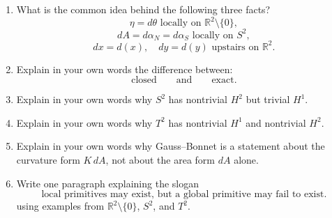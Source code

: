 \documentclass[11pt]{article}
\begin{document}
	\begin{enumerate}[leftmargin=2em,label=\textbf{H\arabic*.}]
		\item What is the common idea behind the following three facts?
		\[
		\eta=d\theta \text{ locally on }\mathbb{R}^2\setminus\{0\},
		\]
		\[
		dA=d\alpha_N=d\alpha_S \text{ locally on }S^2,
		\]
		\[
		dx=d(x),\quad dy=d(y) \text{ upstairs on }\mathbb{R}^2.
		\]
		
		\item Explain in your own words the difference between:
		\[
		\text{closed}
		\qquad\text{and}\qquad
		\text{exact}.
		\]
		
		\item Explain in your own words why \(S^2\) has nontrivial \(H^2\) but trivial \(H^1\).
		
		\item Explain in your own words why \(T^2\) has nontrivial \(H^1\) and nontrivial \(H^2\).
		
		\item Explain in your own words why Gauss--Bonnet is a statement about the curvature form \(K\,dA\), not about the area form \(dA\) alone.
		
		\item Write one paragraph explaining the slogan
		\[
		\boxed{\text{local primitives may exist, but a global primitive may fail to exist.}}
		\]
		using examples from \(\mathbb{R}^2\setminus\{0\}\), \(S^2\), and \(T^2\).
	\end{enumerate}
	
\end{document}
